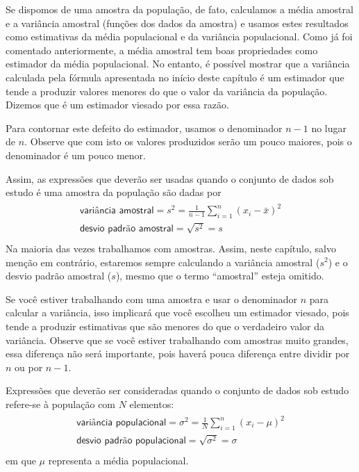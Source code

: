 Se dispomos de uma amostra da população, de fato, calculamos a média amostral e a variância amostral (funções dos dados da amostra) e usamos estes resultados como estimativas da média populacional e da variância populacional. Como já foi comentado anteriormente, a média amostral tem boas propriedades como estimador da média populacional. No entanto, é possível mostrar que a variância calculada pela fórmula apresentada no início deste capítulo é um estimador que tende a produzir valores menores do que o valor da variância da população. Dizemos que é um estimador viesado por essa razão.

Para contornar este defeito do estimador, usamos o denominador \(n-1\) no lugar de \(n\). Observe que com isto os valores produzidos serão um pouco maiores, pois o denominador é um pouco menor.

Assim, as expressões que deverão ser usadas quando o conjunto de dados sob estudo é uma amostra da população são dadas por
\begin{align*}\!\begin{aligned}
\textsf{variância amostral}=s^2=\frac{1}{n-1}\sum^n_{i=1}(x_i-\bar{x})^2\\
\textsf{desvio padrão amostral}=\sqrt{s^2}=s\\
\end{aligned}\end{align*}
Na maioria das vezes trabalhamos com amostras. Assim, neste capítulo, salvo menção em contrário, estaremos sempre calculando a variância amostral (\(s^2\)) e o desvio padrão amostral (\(s\)), mesmo que o termo “amostral” esteja omitido.

Se você estiver trabalhando com uma amostra e usar o denominador \(n\) para calcular a variância, isso implicará que você escolheu um estimador viesado, pois tende a produzir estimativas que são menores do que o verdadeiro valor da variância. Observe que se você estiver trabalhando com amostras muito grandes, essa diferença não será importante, pois haverá pouca diferença entre dividir por \(n\) ou por \(n-1\).

Expressões que deverão ser consideradas quando o conjunto de dados sob estudo refere-se à população com \(N\) elementos:
\begin{align*}\!\begin{aligned}
\textsf{variância populacional} = \sigma^2=\frac{1}{N}\sum^n_{i=1}(x_i-\mu)^2\\
\textsf{desvio padrão populacional}=\sqrt{\sigma^2}=\sigma\\
\end{aligned}\end{align*}
em que \(\mu\) representa a média populacional.

